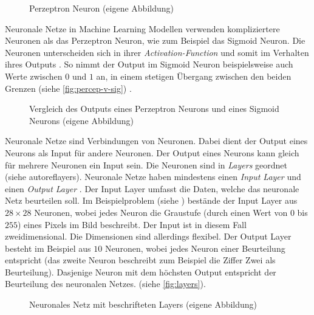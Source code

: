 \begin{figure}[!ht]
   \centering
   \caption{Perzeptron Neuron (eigene Abbildung)}\label{fig:neuron}
\end{figure}
 
Neuronale Netze in Machine Learning Modellen verwenden kompliziertere Neuronen
als das Perzeptron Neuron, wie zum Beispiel das Sigmoid Neuron. Die Neuronen
unterscheiden sich in ihrer \emph{Activation-Function} und somit im Verhalten ihres
Outputs \cite{pragati_baheti_activation_2022}. So nimmt der Output im Sigmoid Neuron
beispielsweise auch Werte zwischen $0$ und $1$ an, in einem stetigen Übergang
zwischen den beiden Grenzen (siehe \autoref{fig:percep-v-sig}) \cite{kumar_sigmoid_2019}.
 
\begin{figure}[!ht]
   \centering
   \caption{Vergleich des Outputs eines Perzeptron Neurons und eines Sigmoid Neurons (eigene Abbildung)}\label{fig:percep-v-sig}
\end{figure}
 
Neuronale Netze sind Verbindungen von Neuronen. Dabei dient der Output eines
Neurons als Input für andere Neuronen. Der Output eines Neurons kann gleich
für mehrere Neuronen ein Input sein. Die Neuronen sind in \emph{Layers} geordnet
(siehe autoref{layers}). Neuronale Netze haben mindestens einen \emph{Input
Layer} und einen \emph{Output Layer}
\cite{nielsen_neural_2015}\cite{ognjanovski_everything_2020}. Der Input Layer
umfasst die Daten, welche das neuronale Netz beurteilen soll. Im
Beispielproblem (siehe ) bestände der Input Layer aus
$28\times28$ Neuronen, wobei jedes Neuron die Graustufe (durch einen Wert von
$0$ bis $255$) eines Pixels im Bild beschreibt. Der Input ist in diesem Fall
zweidimensional. Die Dimensionen sind allerdings flexibel. Der Output Layer
besteht im Beispiel aus $10$ Neuronen, wobei jedes Neuron einer Beurteilung
entspricht (das zweite Neuron beschreibt zum Beispiel die Ziffer Zwei als
Beurteilung). Dasjenige Neuron mit dem höchsten Output entspricht der
Beurteilung des neuronalen Netzes. (siehe \autoref{fig:layers}).
 
\begin{figure}[!ht]
   \centering
   \caption{Neuronales Netz mit beschrifteten Layers (eigene Abbildung)}\label{fig:layers}
\end{figure}
 
